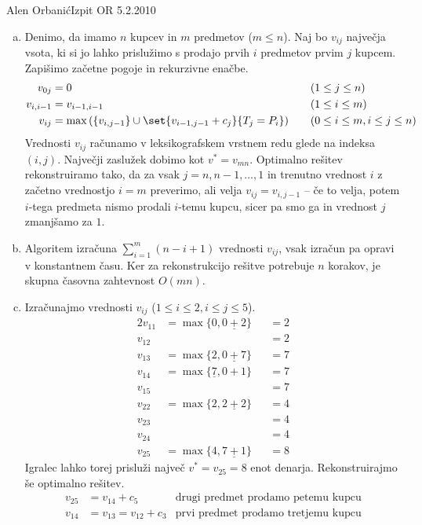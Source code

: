 \begin{naloga}{Alen Orbanić}{Izpit OR 5.2.2010}
\begin{odgovor}
\begin{enumerate}[(a)]
\item Denimo, da imamo $n$ kupcev in $m$ predmetov ($m \le n$).
Naj bo $v_{ij}$ največja vsota,
ki si jo lahko prislužimo s prodajo prvih $i$ predmetov prvim $j$ kupcem.
Zapišimo začetne pogoje in rekurzivne enačbe.
\begin{align*}
v_{0j} &= 0 &&\quad (1 \le j \le n) \\
v_{i,i-1} &= v_{i-1,i-1} &&\quad (1 \le i \le m) \\
v_{ij} &= \max\left(\{v_{i,j-1}\} \cup \set{v_{i-1,j-1} + c_j}{T_j = P_i}\right)
&&\quad (0 \le i \le m, i \le j \le n)
\end{align*}
Vrednosti $v_{ij}$ računamo v leksikografskem vrstnem redu
glede na indeksa $(i, j)$.
Največji zaslužek dobimo kot $v^* = v_{mn}$.
Optimalno rešitev rekonstruiramo tako,
da za vsak $j = n, n-1, \dots, 1$
in trenutno vrednost $i$ z začetno vrednostjo $i = m$ preverimo,
ali velja $v_{ij} = v_{i,j-1}$
-- če to velja, potem $i$-tega predmeta nismo prodali $i$-temu kupcu,
sicer pa smo ga in vrednost $j$ zmanjšamo za $1$.

\item Algoritem izračuna $\sum_{i=1}^m (n-i+1)$ vrednosti $v_{ij}$,
vsak izračun pa opravi v konstantnem času.
Ker za rekonstrukcijo rešitve potrebuje $n$ korakov,
je skupna časovna zahtevnost $O(mn)$.

\item Izračunajmo vrednosti $v_{ij}$ ($1 \le i \le 2, i \le j \le 5$).
\begin{alignat*}{2}
v_{11} &= \max\{0, \underline{0+2}\} &&= 2 \\
v_{12} &&&= 2 \\
v_{13} &= \max\{2, \underline{0+7}\} &&= 7 \\
v_{14} &= \max\{\underline{7}, 0+1\} &&= 7 \\
v_{15} &&&= 7 \\
v_{22} &= \max\{2, \underline{2+2}\} &&= 4 \\
v_{23} &&&= 4 \\
v_{24} &&&= 4 \\
v_{25} &= \max\{4, \underline{7+1}\} &&= 8
\end{alignat*}
Igralec lahko torej prisluži največ $v^* = v_{25} = 8$ enot denarja.
Rekonstruirajmo še optimalno rešitev.
\begin{align*}
v_{25} &= v_{14} + c_5 & \text{drugi predmet prodamo petemu kupcu} \\
v_{14} &= v_{13} = v_{12} + c_3 & \text{prvi predmet prodamo tretjemu kupcu}
\end{align*}
\end{enumerate}
\end{odgovor}
\end{naloga}

